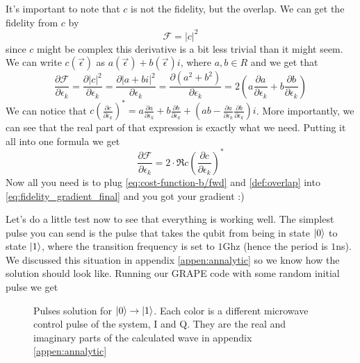 It's important to note that $c$ is not the fidelity, but the overlap. We can get the fidelity from $c$ by
\[
\mathcal{F} = |c|^2
\]
since $c$ might be complex this derivative is a bit less trivial than it might seem. We can write $c (\vec{\epsilon})$ as $a (\vec{\epsilon}) + b (\vec{\epsilon})i$, where $a, b \in R$ and we get that 
\[
\frac{\partial \mathcal{F}}{\partial \epsilon_k} = \frac{\partial |c|^2}{\partial \epsilon_k} = \frac{\partial |a+bi|^2}{\partial \epsilon_k} = \frac{\partial (a^2 + b^2)}{\partial \epsilon_k} = 2 (a\frac{\partial a}{\partial \epsilon_k} + b\frac{\partial b}{\partial \epsilon_k})
\]
We can notice that $c (\frac{\partial c}{\partial \epsilon_k})^* = a\frac{\partial a}{\partial \epsilon_k} + b\frac{\partial b}{\partial \epsilon_k} + (ab - \frac{\partial a}{\partial \epsilon_k}\frac{\partial b}{\partial \epsilon_k})i$. More importantly, we can see that the real part of that expression is exactly what we need. Putting it all into one formula we get
\begin{equation} \label{eq:fidelity_gradient_final}
    \frac{\partial \mathcal{F}}{\partial \epsilon_k} = 2\cdot \Re{c (\frac{\partial c}{\partial \epsilon_k})^*}
\end{equation}
Now all you need is to plug \ref{eq:cost-function-b/fwd} and \ref{def:overlap} into \ref{eq:fidelity_gradient_final} and you got your gradient :)

Let's do a little test now to see that everything is working well. The simplest pulse you can send is the pulse that takes the qubit from being in state $\ket{0}$ to state $\ket{1}$, where the transition frequency is set to $1$Ghz (hence the period is $1$ns). We discussed this situation in appendix \ref{appen:annalytic} so we know how the solution should look like. Running our GRAPE code with some random initial pulse we get
\begin{figure}[H]
    \begin{center}
        
    \end{center}
    \caption{Pulses solution for $\ket{0} \rightarrow \ket{1}$. Each color is a different microwave control pulse of the system, I and Q. They are the real and imaginary parts of the calculated wave in appendix \ref{appen:annalytic} }
    \label{fig:GRAPE-first-example}
\end{figure}

